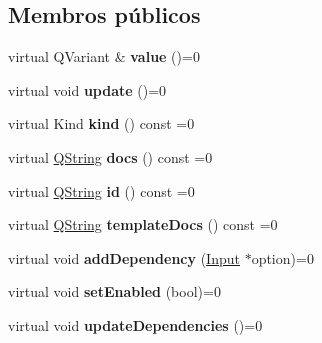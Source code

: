 \subsection*{Membros públicos}
\begin{DoxyCompactItemize}
\item 
\hypertarget{class_input_ac1b843e50d2ec08a19b88ef22346be89}{virtual Q\-Variant \& {\bfseries value} ()=0}\label{class_input_ac1b843e50d2ec08a19b88ef22346be89}

\item 
\hypertarget{class_input_a99b02345a8a15d3c5ea2844a2253f510}{virtual void {\bfseries update} ()=0}\label{class_input_a99b02345a8a15d3c5ea2844a2253f510}

\item 
\hypertarget{class_input_a27e5d1dde6c9e861b52afa5a95f71d2d}{virtual Kind {\bfseries kind} () const =0}\label{class_input_a27e5d1dde6c9e861b52afa5a95f71d2d}

\item 
\hypertarget{class_input_a6d012487844166e3f34716d55ae4571e}{virtual \hyperlink{class_q_string}{Q\-String} {\bfseries docs} () const =0}\label{class_input_a6d012487844166e3f34716d55ae4571e}

\item 
\hypertarget{class_input_a1990f0e4a33413b929369fd70b83cf6d}{virtual \hyperlink{class_q_string}{Q\-String} {\bfseries id} () const =0}\label{class_input_a1990f0e4a33413b929369fd70b83cf6d}

\item 
\hypertarget{class_input_ac1c21ec1e1da960910aabd25cc3e4eb8}{virtual \hyperlink{class_q_string}{Q\-String} {\bfseries template\-Docs} () const =0}\label{class_input_ac1c21ec1e1da960910aabd25cc3e4eb8}

\item 
\hypertarget{class_input_abd4c8c3466e00b7ae7727ec994adc62e}{virtual void {\bfseries add\-Dependency} (\hyperlink{class_input}{Input} $\ast$option)=0}\label{class_input_abd4c8c3466e00b7ae7727ec994adc62e}

\item 
\hypertarget{class_input_ae6d4c50b9e08e4568fc0a7739ee3ecbe}{virtual void {\bfseries set\-Enabled} (bool)=0}\label{class_input_ae6d4c50b9e08e4568fc0a7739ee3ecbe}

\item 
\hypertarget{class_input_add41f2b3348461c2c4a0372341032a01}{virtual void {\bfseries update\-Dependencies} ()=0}\label{class_input_add41f2b3348461c2c4a0372341032a01}


\end{DoxyCompactItemize}
